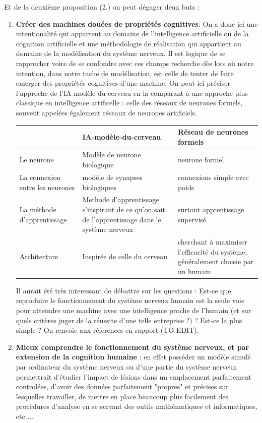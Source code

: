 \documentclass[12pt]{scrartcl}
\begin{document}
	Et de la deuxième proposition (2.) on peut dégager deux buts :  
		\begin{enumerate} \item \textbf{Créer des machines douées de propriétés cognitives}: On a donc ici une intentionalité qui appartent au domaine de l'intelligence artificielle ou de la cognition artificielle et une méthodologie de réalisation qui appartient au domaine de la modélisation du système nerveux. Il est logique de se rapprocher voire de se confondre avec ces champs recherche dès lors où notre intention, dans notre tache de modélisation, est celle de tenter de faire emerger des propriétés cognitives d'une machine. On peut ici préciser l'approche de l'IA-modèle-du-cerveau en la comparant à une approche plus classique en intelligence artificelle : celle des réseaux de neurones formels, souvent appelées également réseaux de neurones artificiels.  \begin{tabular}{|p{4cm}|p{5cm}|p{5cm}|} \hline&IA-modèle-du-cerveau & Réseau de neurones formels \\\hline Le neurone & Modèle de neurone biologique & neurone formel \\\hline La connexion entre les neurones & modèle de synapses biologiques & connexions simple avec poids \\\hline  La méthode d'apprentissage & Methode d'apprentissage s'inspirant de ce qu'on sait de l'apprentissage dans le système nerveux & surtout apprentissage supervisé \\\hline   Architecture & Inspirée de celle du cerveau & cherchant à maximiser l'efficacité du système, généralement choisie par un humain \\\hline \end{tabular}  Il aurait été très interessant de débattre sur les questions : Est-ce que reproduire le fonctionnement du système nerveux humain est la seule voie pour atteindre une machine avec une intelligence proche de l'humain (et sur quels critères juger de la réussite d'une telle entreprise ?) ? Est-ce la plus simple ? On renvoie aux réferences en rapport (TO EDIT).
		 \item \textbf{Mieux comprendre le fonctionnement du système nerveux, et par extension de la cognition humaine} : en effet posséder un modèle simulé par ordinateur du système nerveux ou d'une partie du système nerveux permettrait d'étudier l'impact de lésions dans un emplacement parfaitement controlées, d'avoir des données parfaitement "propres" et précises sur lesquelles travailler, de mettre en place beaucoup plus facilement des procèdures d'analyse en se servant des outils mathématiques et informatiques, etc ...

\end{enumerate}
\end{document}
